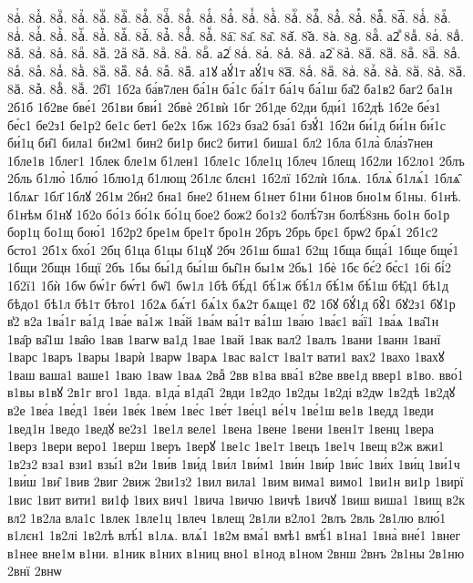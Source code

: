 {8а҆ⷮ.
8а҆ⷯ.
8а҆ⷰ.
8а҆ⷱ.
8а҆ⷲ.
8а҆ⷳ.
8а҆ⷴ.
8а҆ⷵ.
8а҆ⷶ.
8а҆ⷷ.
8а҆ⷸ.
8а҆ⷹ.
8а҆ⷺ.
8а҆ⷻ.
8а҆ⷼ.
8а҆ⷽ.
8а҆ⷾ.
8а҆ⷿ.
8а҆꙯.
8а҆ꙴ.
8а҆ꙵ.
8а҆ꙶ.
8а҆ꙷ.
8а҆ꙸ.
8а҆ꙹ.
8а҆ꙺ.
8а҆ꙻ.
8а҆꙼.
8а҆꙽.
8а҆ꚞ.
8а҆ꚟ.
8а҇.
8а᷀.
8а᷁.
8а᷶.
8а᷷.
8а᷸.
8а᷹.
8аⷠ.
а2ⷡ
8аⷡ.
8аⷢ.
8аⷣ.
8аⷤ.
8аⷥ.
8аⷦ.
8аⷧ.
8аⷨ.
2аⷩ
8аⷩ.
8аⷪ.
8аⷫ.
8аⷬ.
а2ⷭ
8аⷭ.
8аⷮ.
8аⷯ.
8аⷰ.
а2ⷱ
8аⷱ.
8аⷲ.
8аⷳ.
8аⷴ.
8аⷵ.
8аⷶ.
8аⷷ.
8аⷸ.
8аⷹ.
8аⷺ.
8аⷻ.
8аⷼ.
8аⷽ.
8аⷾ.
8аⷿ.
а1ꙋ
аꙋ́1т
аꙋ́1ч
8а꙯.
8аꙴ.
8аꙵ.
8аꙶ.
8аꙷ.
8аꙸ.
8аꙹ.
8аꙺ.
8аꙻ.
8а꙼.
8а꙽.
8аꚞ.
8аꚟ.
2б̾1
1б2а
ба́в7лен
ба́1н
ба́1с
ба́1т
ба́1ч
ба́1ш
ба̑2
ба1в2
баг2
ба1н
2б1б
1б2ве
бве́1
2б1ви
бви́1
2бвѐ
2б1вѝ
1бг
2б1де
б2ди
бди́1
1б2дѣ
1б2е
бе́з1
бе́с1
бе2з1
бе1р2
бе1с
бет1
бе2х
1бж
1б2з
бза2
бза́1
бзꙋ́1
1б2и
би́1д
би́1н
би́1с
би́1ц
би̑1
била1
би2м1
бин2
би1р
бис2
бити1
биша1
бл2
1бла
б1ла̀
бла́з7нен
1бле1в
1блег1
1блек
бле1м
б1лен1
1бле1с
1бле1ц
1блеч
1блещ
1б2ли
1б2ло1
2блъ
2бль
б1лю̀
1блю́
1блю1д
б1лющ
2б1лє
блєн1
1б2лї
1б2лѝ
1блѧ.
1блѧ̀
б1лѧ́1
1блѧ̑
1блѧг
1бл҃
1блꙋ
2б1м
2бн2
бна1
бне2
б1нем
б1нет
б1ни
б1нов
бно1м
б1ны.
б1нѣ.
б1нѣм
б1нꙋ
1б2о
бо́1з
бо́1к
бо́1ц
бое2
бож2
бо1з2
болѣ́7зн
болѣ́8знь
бо1н
бо1р
бор1ц
бо1щ
бою́1
1б2р2
бре1м
бре1т
бро1н
2бръ
2брь
брє1
брѡ2
брѧ́1
2б1с2
бсто1
2б1х
бхо́1
2бц
б1ца
б1цы
б1цꙋ
2бч
2б1ш
бша1
б2щ
1бща
бща́1
1бще
бще́1
1бщи
2бщн
1бщї
2бъ
1бы
бы́1д
бы́1ш
бы̑1н
бы1м
2бь1
1бѐ
1бє
бє́2
бє́с1
1бі
бі́2
1б2ї1
1бѝ
1бѡ
бѡ́1г
бѡ́т1
бѡ̑1
бѡ1л
1бѣ
бѣ́д1
бѣ́1ж
бѣ́1л
бѣ́1м
бѣ́1ш
бѣ̑д1
бѣ1д
бѣдо1
бѣ1л
бѣ1т
бѣто1
1б2ѧ
бѧ́т1
бѧ́1х
бѧ2т
бѧще1
б҃2
1бꙋ
бꙋ́1д
бꙋ̑1
бꙋ2з1
бꙋ1р
в̾2
в2а
1ва́1г
ва́1д
1ва́е
ва́1ж
1ва́й
1ва́м
ва́1т
ва́1ш
1ва́ю
1ва́є1
ва́ї1
1ва́ѧ
1ва̑1н
1ва̑р
ва̑1ш
1ва̑ю
1вав
1вагѡ
ва1д
1вае
1вай
1вак
вал2
1валъ
1вани
1ванн
1ванї
1варс
1варъ
1вары
1варѝ
1варѡ
1варѧ
1вас
ва1ст
1ва1т
вати1
вах2
1вахо
1вахꙋ
1ваш
ваша1
ваше1
1ваю
1ваѡ
1ваѧ
2ваⷤ
2вв
в1ва
вва́1
в2ве
вве1д
ввер1
в1во.
вво́1
в1вы
в1вꙋ
2в1г
вго1
1вда.
в1да́
в1да̑1
2вди
1в2до
1в2ды
1в2ді
в2дѡ
1в2дѣ
1в2дꙋ
в2е
1ве́а
1ве́д1
1ве́и
1ве́к
1ве́м
1ве́с
1ве́т
1ве́ц1
ве́1ч
1ве́1ш
ве1в
1ведд
1веди
1вед1н
1ведо
1ведꙋ
ве2з1
1ве1л
веле1
1вена
1вене
1вени
1вен1т
1венц
1вера
1верз
1вери
веро1
1верш
1веръ
1верꙋ
1ве1с
1ве1т
1вецъ
1ве1ч
1вещ
в2ж
вжи1
1в2з2
вза1
взи1
взы́1
в2и
1ви́в
1ви́д
1ви́л
1ви́м1
1ви́н
1ви́р
1ви́с
1ви́х
1ви́ц
1ви́1ч
1ви́ш
1ви̑
1вив
2виг
2виж
2ви1з2
1вил
вила1
1вим
вима1
вимо1
1ви1н
ви1р
1вирї
1вис
1вит
вити1
ви1ф
1вих
вич1
1вича
1вичю
1вичѣ
1вичꙋ
1виш
виша1
1вищ
в2к
вл2
1в2ла
вла1с
1влек
1вле1ц
1влеч
1влещ
2в1ли
в2ло1
2влъ
2вль
2в1лю
влю́1
в1лєн1
1в2лі
1в2лѣ
влѣ́1
в1лѧ.
влѧ́1
1в2м
вма́1
вмѣ1
вмѣ́1
в1на1
1вна̀
вне́1
1внег
в1нее
вне1м
в1ни.
в1ник
в1них
в1ниц
вно1
в1нод
в1ном
2внш
2внъ
2в1ны
2в1ню
2внї
2внѡ
}
